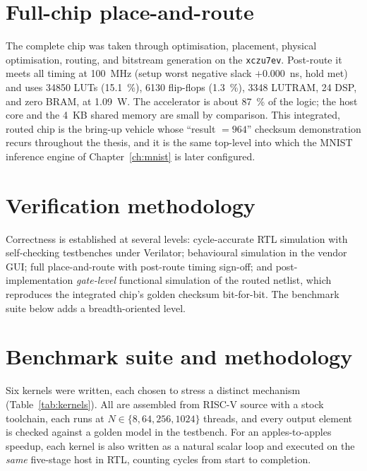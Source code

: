\documentclass[12pt,a4paper,oneside]{report}
\newcommand{\code}[1]{\texttt{#1}}
\begin{document}
\section{Full-chip place-and-route}
The complete chip was taken through optimisation, placement, physical
optimisation, routing, and bitstream generation on the \code{xczu7ev}. Post-route
it meets all timing at \SI{100}{\mega\hertz} (setup worst negative slack
$+0.000$~ns, hold met) and uses \num{34850} LUTs (\SI{15.1}{\percent}), \num{6130}
flip-flops (\SI{1.3}{\percent}), \num{3348} LUTRAM, 24 DSP, and zero BRAM, at
\SI{1.09}{\watt}. The accelerator is about \SI{87}{\percent} of the logic; the
host core and the 4~KB shared memory are small by comparison. This integrated,
routed chip is the bring-up vehicle whose ``result $=964$'' checksum demonstration
recurs throughout the thesis, and it is the same top-level into which the MNIST
inference engine of Chapter~\ref{ch:mnist} is later configured.

\section{Verification methodology}
Correctness is established at several levels: cycle-accurate RTL simulation with
self-checking testbenches under Verilator; behavioural simulation in the vendor
GUI; full place-and-route with post-route timing sign-off; and
post-implementation \emph{gate-level} functional simulation of the routed netlist,
which reproduces the integrated chip's golden checksum bit-for-bit. The benchmark
suite below adds a breadth-oriented level.

\section{Benchmark suite and methodology}
Six kernels were written, each chosen to stress a distinct mechanism
(Table~\ref{tab:kernels}). All are assembled from RISC-V source with a stock
toolchain, each runs at $N\in\{8,64,256,1024\}$ threads, and every output element
is checked against a golden model in the testbench. For an apples-to-apples
speedup, each kernel is also written as a natural scalar loop and executed on the
\emph{same} five-stage host in RTL, counting cycles from start to completion.
\end{document}
